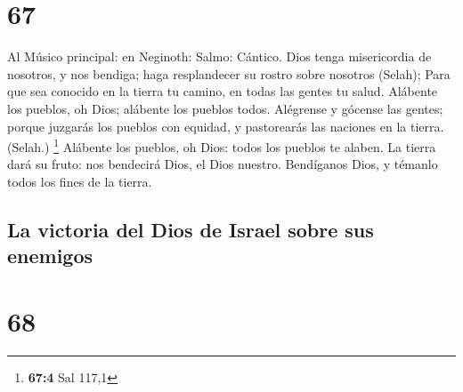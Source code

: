 \hypertarget{section-66}{%
\section{67}\label{section-66}}

 Al Músico principal: en Neginoth: Salmo: Cántico. Dios
tenga misericordia de nosotros, y nos bendiga; haga resplandecer su
rostro sobre nosotros (Selah);  Para que sea conocido en la
tierra tu camino, en todas las gentes tu salud.  Alábente
los pueblos, oh Dios; alábente los pueblos todos.  Alégrense
y gócense las gentes; porque juzgarás los pueblos con equidad, y
pastorearás las naciones en la tierra. (Selah.) \footnote{\textbf{67:4}
  Sal 117,1}  Alábente los pueblos, oh Dios: todos los
pueblos te alaben.  La tierra dará su fruto: nos bendecirá
Dios, el Dios nuestro.  Bendíganos Dios, y témanlo todos los
fines de la tierra.

\hypertarget{la-victoria-del-dios-de-israel-sobre-sus-enemigos}{%
\subsection{La victoria del Dios de Israel sobre sus
enemigos}\label{la-victoria-del-dios-de-israel-sobre-sus-enemigos}}

\hypertarget{section-67}{%
\section{68}\label{section-67}}

